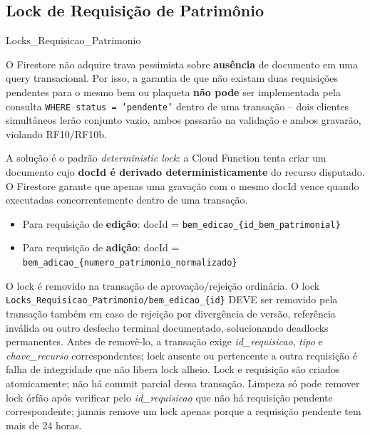 \subsection{Lock de Requisição de Patrimônio}
\begin{entidade}{Locks\_Requisicao\_Patrimonio}
\end{entidade}

\begin{regra}
O Firestore não adquire trava pessimista sobre \textbf{ausência} de documento em uma query transacional. Por isso, a garantia de que não existam duas requisições pendentes para o mesmo bem ou plaqueta \textbf{não pode} ser implementada pela consulta \texttt{WHERE status = 'pendente'} dentro de uma transação -- dois clientes simultâneos lerão conjunto vazio, ambos passarão na validação e ambos gravarão, violando RF10/RF10b.

A solução é o padrão \textit{deterministic lock}: a Cloud Function tenta criar um documento cujo \textbf{docId é derivado deterministicamente} do recurso disputado. O Firestore garante que apenas uma gravação com o mesmo docId vence quando executadas concorrentemente dentro de uma transação.

\begin{itemize}
  \item Para requisição de \textbf{edição}: docId = \texttt{bem\_edicao\_\{id\_bem\_patrimonial\}}
  \item Para requisição de \textbf{adição}: docId = \texttt{bem\_adicao\_\{numero\_patrimonio\_normalizado\}}
\end{itemize}

O lock é removido na transação de aprovação/rejeição ordinária. O lock \texttt{Locks\_Requisicao\_Patrimonio/bem\_edicao\_\{id\}} DEVE ser removido pela transação também em caso de rejeição por divergência de versão, referência inválida ou outro desfecho terminal documentado, solucionando deadlocks permanentes. Antes de removê-lo, a transação exige \textit{id\_requisicao}, \textit{tipo} e \textit{chave\_recurso} correspondentes; lock ausente ou pertencente a outra requisição é falha de integridade que não libera lock alheio. Lock e requisição são criados atomicamente; não há commit parcial dessa transação. Limpeza só pode remover lock órfão após verificar pelo \textit{id\_requisicao} que não há requisição pendente correspondente; jamais remove um lock apenas porque a requisição pendente tem mais de 24 horas.
\end{regra}

